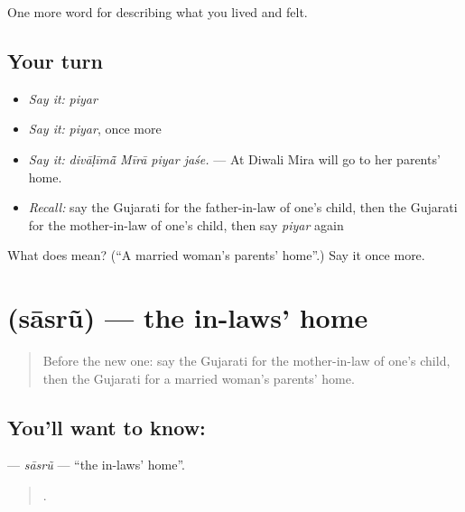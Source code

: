 \begin{grammarlens}[title={What you've built}]
One more word for describing what you lived and felt.
\end{grammarlens}

\subsection*{Your turn}
\begin{itemize}
\raggedright
  \item \emph{Say it:} \emph{piyar}
  \item \emph{Say it:} \emph{piyar}, once more
  \item \emph{Say it:} \emph{divāḷīmā̃ Mīrā piyar jaśe.} — At Diwali Mira will go to her parents' home.
  \item \emph{Recall:} say the Gujarati for the father-in-law of one's child, then the Gujarati for the mother-in-law of one's child, then say \emph{piyar} again
\end{itemize}

\begin{tcolorbox}[breakable,colback=teal!4,colframe=teal!35!black,title={Before you move on}]
What does  mean? (\textquotedblleft{}A married woman's parents' home\textquotedblright{}.) Say it once more.
\end{tcolorbox}
\section[\texorpdfstring{\gu{સાસરું} (sāsrũ)}{સાસરું (sāsrũ)}]{ (sāsrũ) — the in-laws' home}

\label{lesson:GU-C492-sasru}



\begin{quote}
Before the new one: say the Gujarati for the mother-in-law of one's child, then the Gujarati for a married woman's parents' home.
\end{quote}

\subsection*{You'll want to know: }
\textbf{} — \emph{sāsrũ} — \textquotedblleft{}the in-laws' home\textquotedblright{}.

\begin{quote}
    .
\end{quote}

